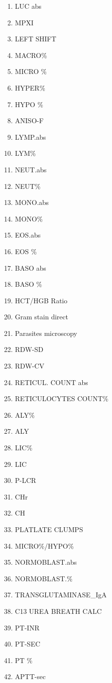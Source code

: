 \documentclass[a4paper,12pt]{article}
\begin{document}
\begin{appendices}
\begin{enumerate}
   			\item LUC abs
   			\item MPXI
   			\item LEFT SHIFT
   			\item MACRO\%
   			\item MICRO \%
   			\item HYPER\%
   			\item HYPO \%
   			\item ANISO-F
   			\item LYMP.abs
   			\item LYM\%
   			\item NEUT.abs
   			\item NEUT\%
   			\item MONO.abs
   			\item MONO\%
   			\item EOS.abs
   			\item EOS \%
   			\item BASO abs
   			\item BASO \%
   			\item HCT/HGB Ratio
   			\item Gram stain direct
   			\item Parasites microscopy
   			\item RDW-SD
   			\item RDW-CV
   			\item RETICUL. COUNT abs
   			\item RETICULOCYTES COUNT\%
   			\item ALY\%
   			\item ALY
   			\item LIC\%
   			\item LIC
   			\item P-LCR
   			\item CHr
   			\item CH
   			\item PLATLATE CLUMPS
   			\item MICRO\%/HYPO\%
   			\item NORMOBLAST.abs
   			\item NORMOBLAST.\%
   			\item TRANSGLUTAMINASE\_IgA
   			\item C13 UREA BREATH CALC
   			\item PT-INR
   			\item PT-SEC
   			\item PT \%
   			\item APTT-sec

\end{enumerate}
\end{appendices}
\end{document}
